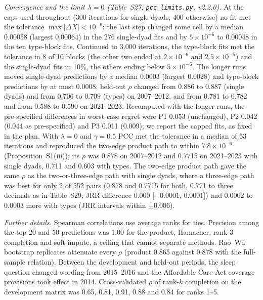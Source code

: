 \documentclass[journal]{IEEEtran}
\begin{document}
\emph{Convergence and the limit $\lambda=0$ (Table~S27; \texttt{pcc\_limits.py}, v2.2.0).} At the caps used throughout (300 iterations for single dyads, 400 otherwise) no fit met the tolerance $\max|\Delta X|<10^{-6}$: the last step changed some cell by a median 0.00058 (largest 0.00064) in the 276 single-dyad fits and by $5\times10^{-6}$ to 0.00048 in the ten type-block fits. Continued to 3,000 iterations, the type-block fits met the tolerance in 8 of 10 blocks (the other two ended at $2\times10^{-6}$ and $2.5\times10^{-5}$) and the single-dyad fits in 10\%, the others ending below $5\times10^{-6}$. The longer runs moved single-dyad predictions by a median 0.0003 (largest 0.0028) and type-block predictions by at most 0.0008; held-out $\rho$ changed from 0.886 to 0.887 (single dyads) and from 0.706 to 0.709 (types) on 2007--2012, and from 0.781 to 0.782 and from 0.588 to 0.590 on 2021--2023. Recomputed with the longer runs, the pre-specified differences in worst-case regret were P1 0.053 (unchanged), P2 0.042 (0.044 as pre-specified) and P3 0.011 (0.009); we report the capped fits, as fixed in the plan. With $\lambda=0$ and $\gamma=0.5$ PCC met the tolerance in a median of 53 iterations and reproduced the two-edge product path to within $7.8\times10^{-6}$ (Proposition~S1(iii)); its $\rho$ was 0.878 on 2007--2012 and 0.7715 on 2021--2023 with single dyads, 0.711 and 0.603 with types. The two-edge product path gave the same $\rho$ as the two-or-three-edge path with single dyads, where a three-edge path was best for only 2 of 552 pairs (0.878 and 0.7715 for both, 0.771 to three decimals as in Table~S29; JRR difference 0.000 [$-0.0001$, 0.0001]) and 0.0002 to 0.0003 more with types (JRR intervals within $\pm0.006$).

\emph{Further details.} Spearman correlations use average ranks for ties. Precision among the top 20 and 50 predictions was 1.00 for the product, Hamacher, rank-3 completion and soft-impute, a ceiling that cannot separate methods. Rao--Wu bootstrap replicates attenuate every $\rho$ (product 0.865 against 0.878 with the full-sample relation). Between the development and held-out periods, the sleep question changed wording from 2015--2016 and the Affordable Care Act coverage provisions took effect in 2014. Cross-validated $\rho$ of rank-$k$ completion on the development matrix was 0.65, 0.81, 0.91, 0.88 and 0.84 for ranks 1--5.
\end{document}
